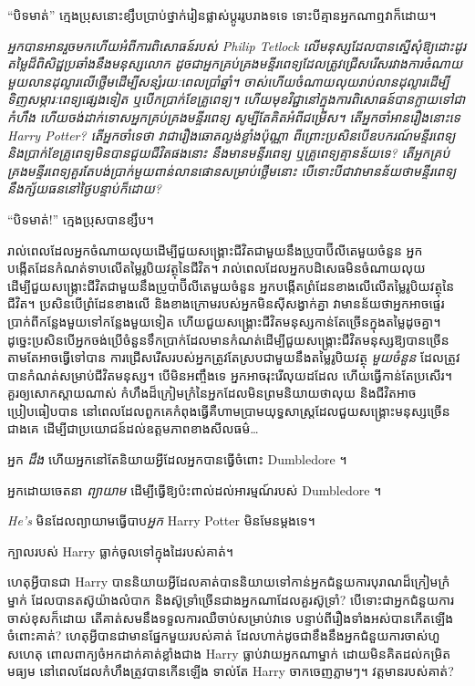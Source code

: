 {{{“បិទមាត់” ក្មេងប្រុសនោះខ្សឹបប្រាប់ថ្នាក់រៀនផ្លាស់ប្តូររូបរាងទទេ ទោះបីគ្មានអ្នកណាឮវាក៏ដោយ។

\emph{អ្នកបានអានរួចមកហើយអំពីការពិសោធន៍របស់ Philip Tetlock លើមនុស្សដែលបានស្នើសុំឱ្យដោះដូរតម្លៃដ៏ពិសិដ្ឋប្រឆាំងនឹងមនុស្សលោក ដូចជាអ្នកគ្រប់គ្រងមន្ទីរពេទ្យដែលត្រូវជ្រើសរើសរវាងការចំណាយមួយលានដុល្លារលើថ្លើមដើម្បីសន្សំរយៈពេលប្រាំឆ្នាំ។ ចាស់​ហើយ​ចំណាយ​លុយ​រាប់​លាន​ដុល្លារ​ដើម្បី​ទិញ​សម្ភារៈ​ពេទ្យ​ផ្សេង​ទៀត ឬ​បើក​ប្រាក់​ខែ​គ្រូពេទ្យ។ ហើយមុខវិជ្ជានៅក្នុងការពិសោធន៍បានក្លាយទៅជាកំហឹង ហើយចង់ដាក់ទោសអ្នកគ្រប់គ្រងមន្ទីរពេទ្យ សូម្បីតែគិតអំពីជម្រើស។ តើ​អ្នក​ចាំ​អាន​រឿង​នោះ​ទេ Harry Potter? តើអ្នកចាំទេថា វាជារឿងឆោតល្ងង់ខ្លាំងប៉ុណ្ណា ពីព្រោះប្រសិនបើឧបករណ៍មន្ទីរពេទ្យ និងប្រាក់ខែគ្រូពេទ្យមិនបានជួយជីវិតផងនោះ នឹងមានមន្ទីរពេទ្យ ឬគ្រូពេទ្យគ្មានន័យទេ? តើអ្នកគ្រប់គ្រងមន្ទីរពេទ្យគួរតែបង់ប្រាក់មួយពាន់លានផោនសម្រាប់ថ្លើមនោះ បើទោះបីជាវាមានន័យថាមន្ទីរពេទ្យនឹងក្ស័យធននៅថ្ងៃបន្ទាប់ក៏ដោយ?}

“បិទមាត់!” ក្មេងប្រុសបានខ្សឹប។

\begin{em}
រាល់ពេលដែលអ្នកចំណាយលុយដើម្បីជួយសង្គ្រោះជីវិតជាមួយនឹងប្រូបាប៊ីលីតេមួយចំនួន អ្នកបង្កើតដែនកំណត់ទាបលើតម្លៃរូបិយវត្ថុនៃជីវិត។ រាល់ពេលដែលអ្នកបដិសេធមិនចំណាយលុយដើម្បីជួយសង្គ្រោះជីវិតជាមួយនឹងប្រូបាប៊ីលីតេមួយចំនួន អ្នកបង្កើតព្រំដែនខាងលើលើតម្លៃរូបិយវត្ថុនៃជីវិត។ ប្រសិនបើព្រំដែនខាងលើ និងខាងក្រោមរបស់អ្នកមិនស៊ីសង្វាក់គ្នា វាមានន័យថាអ្នកអាចផ្ទេរប្រាក់ពីកន្លែងមួយទៅកន្លែងមួយទៀត ហើយជួយសង្គ្រោះជីវិតមនុស្សកាន់តែច្រើនក្នុងតម្លៃដូចគ្នា។ ដូច្នេះប្រសិនបើអ្នកចង់ប្រើចំនួនទឹកប្រាក់ដែលមានកំណត់ដើម្បីជួយសង្គ្រោះជីវិតមនុស្សឱ្យបានច្រើនតាមតែអាចធ្វើទៅបាន ការជ្រើសរើសរបស់អ្នកត្រូវតែស្របជាមួយនឹងតម្លៃរូបិយវត្ថុ \emph{មួយចំនួន} ដែលត្រូវបានកំណត់សម្រាប់ជីវិតមនុស្ស។ បើមិនអញ្ចឹងទេ អ្នកអាចរុះរើលុយដដែល ហើយធ្វើកាន់តែប្រសើរ។ គួរឲ្យសោកស្ដាយណាស់ កំហឹងដ៏ក្រៀមក្រំនៃអ្នកដែលមិនព្រមនិយាយថាលុយ និងជីវិតអាចប្រៀបធៀបបាន នៅពេលដែលពួកគេកំពុងធ្វើគឺហាមប្រាមយុទ្ធសាស្ត្រដែលជួយសង្គ្រោះមនុស្សច្រើនជាងគេ ដើម្បីជាប្រយោជន៍ដល់ឧត្តមភាពខាងសីលធម៌…

អ្នក \emph{ដឹង} ហើយអ្នកនៅតែនិយាយអ្វីដែលអ្នកបានធ្វើចំពោះ Dumbledore ។

អ្នកដោយចេតនា \emph{ព្យាយាម} ដើម្បីធ្វើឱ្យប៉ះពាល់ដល់អារម្មណ៍របស់ Dumbledore ។

\emph{He's} មិនដែលព្យាយាមធ្វើបាប\emph{អ្នក} Harry Potter មិនមែនម្តងទេ។
\end{em}

ក្បាលរបស់ Harry ធ្លាក់ចូលទៅក្នុងដៃរបស់គាត់។

ហេតុអ្វីបានជា Harry បាននិយាយអ្វីដែលគាត់បាននិយាយទៅកាន់អ្នកជំនួយការបុរាណដ៏ក្រៀមក្រំម្នាក់ ដែលបានតស៊ូយ៉ាងលំបាក និងស៊ូទ្រាំច្រើនជាងអ្នកណាដែលគួរស៊ូទ្រាំ? បើទោះជាអ្នកជំនួយការចាស់ខុសក៏ដោយ តើគាត់សមនឹងទទួលការឈឺចាប់សម្រាប់វាទេ បន្ទាប់ពីរឿងទាំងអស់បានកើតឡើងចំពោះគាត់? ហេតុអ្វីបានជាមានផ្នែកមួយរបស់គាត់ ដែលហាក់ដូចជាខឹងនឹងអ្នកជំនួយការចាស់ហួសហេតុ ពោលពាក្យចំអកដាក់គាត់ខ្លាំងជាង Harry ធ្លាប់វាយអ្នកណាម្នាក់ ដោយមិនគិតដល់កម្រិតមធ្យម នៅពេលដែលកំហឹងត្រូវបានកើនឡើង ទាល់តែ Harry ចាកចេញភ្លាមៗ។ វត្តមានរបស់គាត់?

}}}
